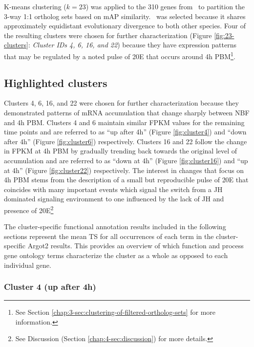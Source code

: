K-means clustering ($k=23$) was applied to the 310 genes from \Ag\ to partition the 3-way 1:1 ortholog sets based on \gls{mAP} similarity.
%
\Ag\ was selected because it shares approximately equidistant evolutionary divergence to both other species.
%
Four of the resulting clusters were chosen for further characterization (Figure \ref{fig:23-clusters}: \textit{Cluster IDs 4, 6, 16, and 22}) because they have expression patterns that may be regulated by a noted pulse of \gls{20E} that occurs around 4h \gls{PBM}\footnote{See Section \ref{chap:3-sec:clustering-of-filtered-ortholog-sets} for more information.}.
%


\subsection{Highlighted clusters}

Clusters 4, 6, 16, and 22 were chosen for further characterization because they demonstrated patterns of mRNA accumulation that change sharply between \gls{NBF} and 4h \gls{PBM}.
%
Clusters 4 and 6 maintain similar \gls{FPKM} values for the remaining time points and are referred to as ``up after 4h'' (Figure \ref{fig:cluster4}) and ``down after 4h'' (Figure \ref{fig:cluster6}) respectively.
%
Clusters 16 and 22 follow the change in \gls{FPKM} at 4h \gls{PBM} by gradually trending back towards the original level of accumulation and are referred to as ``down at 4h'' (Figure \ref{fig:cluster16}) and ``up at 4h'' (Figure \ref{fig:cluster22}) respectively.
%
The interest in changes that focus on 4h \gls{PBM} stems from the description of a small but reproducible pulse of \gls{20E} that coincides with many important events which signal the switch from a \gls{JH} dominated signaling environment to one influenced by the lack of \gls{JH} and presence of \gls{20E}\footnote{See Discussion (Section \ref{chap:4-sec:discussion}) for more details.}

The cluster-specific functional annotation results included in the following sections represent the mean \gls{TS} for all occurrences of each term in the cluster-specific \gls{Argot2} results.
%
This provides an overview of which function and process gene ontology terms characterize the cluster as a whole as opposed to each individual gene.

\subsubsection{Cluster 4 (up after 4h)}

